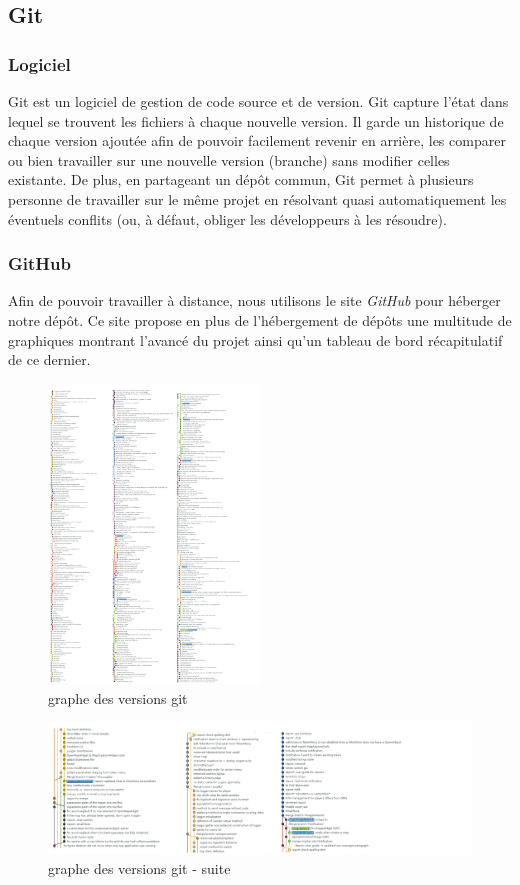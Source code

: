 \subsection{Git}
\subsubsection{Logiciel}
Git est un logiciel de gestion de code source et de version. Git capture l'état dans lequel se trouvent les fichiers à chaque nouvelle version. Il garde un historique de chaque version ajoutée afin de pouvoir facilement revenir en arrière, les comparer ou bien travailler sur une nouvelle version (branche) sans modifier celles existante. De plus, en partageant un dépôt commun, Git permet à plusieurs personne de travailler sur le même projet en résolvant quasi automatiquement les éventuels conflits (ou, à défaut, obliger les développeurs à les résoudre).

\subsubsection{GitHub}
Afin de pouvoir travailler à distance, nous utilisons le site \textit{GitHub} pour héberger notre dépôt.
Ce site propose en plus de l'hébergement de dépôts une multitude de graphiques montrant l'avancé du projet ainsi qu'un tableau de bord récapitulatif de ce dernier.


\begin{figure}[h!]
	\centering
	\includegraphics[width=0.5\textwidth]{img/state_git_graph.png}
	\caption{graphe des versions git}
\end{figure}

\newpage
\begin{figure}[h!]
	\centering
	\includegraphics[width=1.0\textwidth]{img/state_git_graph_2.png}
	\caption{graphe des versions git - suite}
	\label{fig:notification}
\end{figure}
